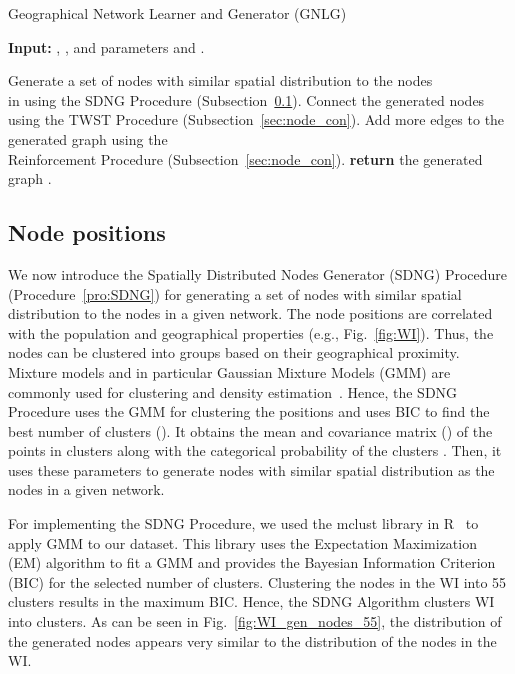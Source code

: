 \documentclass[10pt,journal]{IEEEtran}
\begin{document}
\begin{algorithm}[t]
\footnotesize
\caption{Geographical Network Learner and Generator (GNLG)}
\begin{trivlist}
\item\textbf{Input:} , , and parameters  and .
\end{trivlist}
\vspace*{-3mm}
\begin{algorithmic}[1]
\STATE Generate a set of nodes with similar spatial distribution to the nodes \\in  using the SDNG Procedure (Subsection~\ref{sec:node_pos}).
\STATE Connect the generated nodes using the TWST Procedure (Subsection~\ref{sec:node_con}).
\STATE Add more edges to the generated graph using the \\Reinforcement Procedure (Subsection~\ref{sec:node_con}).
\STATE \textbf{return} the generated graph .
\end{algorithmic}
\label{alg:GSN}
\end{algorithm}

\subsection{Node positions}\label{sec:node_pos}

We now introduce the Spatially Distributed Nodes Generator (SDNG) Procedure (Procedure~\ref{pro:SDNG}) for  generating a set of nodes with similar spatial distribution to the nodes in a given network. The node positions are correlated with the population and geographical properties (e.g.,  Fig.~\ref{fig:WI}). Thus, the nodes can be clustered into groups based on their geographical proximity. Mixture models and in particular Gaussian Mixture Models (GMM) are commonly used for clustering and density estimation~\cite{fraley2002model}. Hence, the SDNG Procedure uses the GMM for clustering the positions and uses BIC to find the best number of clusters (). It obtains the mean and covariance matrix () of the points in clusters   along with the categorical probability of the clusters . Then, it uses these parameters to generate  nodes with similar spatial distribution as the nodes in a given network.

For implementing the SDNG Procedure, we used the {\ttfamily mclust} library in {\ttfamily R}~\cite{fraley2012mclust} to apply GMM to our dataset. This library uses the Expectation Maximization (EM) algorithm to fit a GMM and provides the Bayesian Information Criterion (BIC) for the selected number of clusters.
Clustering the nodes in the WI into 55 clusters results in the maximum BIC. Hence, the SDNG Algorithm clusters WI into  clusters. As can be seen in Fig.~\ref{fig:WI_gen_nodes_55}, the distribution of the generated nodes appears very similar to the distribution of the nodes in the WI.
\end{document}
